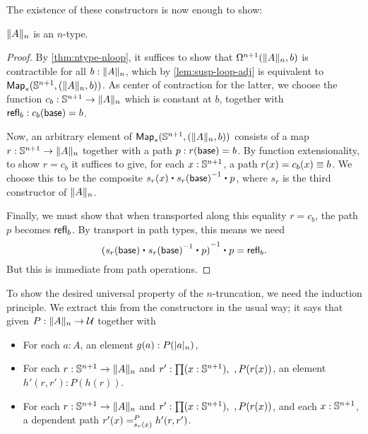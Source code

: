 The existence of these constructors is now enough to show:

\begin{lem}
  $\trunc n A$ is an $n$-type.
\end{lem}
\begin{proof}
  By \autoref{thm:ntype-nloop}, it suffices to show that $\Omega ^{n+1}(\trunc nA,b)$ is contractible for all $b:\trunc nA$, which by \autoref{lem:susp-loop-adj} is equivalent to $\Map_*(\Sn^{n+1},(\trunc nA,b))$.
  As center of contraction for the latter, we choose the function $c_b:\Sn^{n+1} \to \trunc nA$ which is constant at $b$, together with $\refl b : c_b(\base) = b$.

  Now, an arbitrary element of $\Map_*(\Sn^{n+1},(\trunc nA,b))$ consists of a map $r:\Sn^{n+1} \to \trunc n A$ together with a path $p:r(\base)=b$.
  By function extensionality, to show $r = c_b$ it suffices to give, for each $x:\Sn^{n+1}$, a path $r(x)=c_b(x) \jdeq b$.
  We choose this to be the composite $s_r(x) \ct \opp{s_r(\base)} \ct p$, where $s_r$ is the third constructor of $\trunc nA$.

  Finally, we must show that when transported along this equality $r=c_b$, the path $p$ becomes $\refl b$.
  By transport in path types, this means we need
  \[\opp{(s_r(\base) \ct \opp{s_r(\base)} \ct p)} \ct p = \refl b.\]
  But this is immediate from path operations.
\end{proof}

To show the desired universal property of the $n$-truncation, we need the induction principle.
We extract this from the constructors in the usual way; it says that given $P:\trunc nA\to\type$ together with
\begin{itemize}
\item For each $a:A$, an element $g(a) : P(\tproj na)$,
\item For each $r:\Sn^{n+1} \to \trunc n A$ and $r':\prd{x:\Sn^{n+1}}, P(r(x))$, an element $h'(r,r'):P(h(r))$.
\item For each $r:\Sn^{n+1} \to \trunc n A$ and $r':\prd{x:\Sn^{n+1}}, P(r(x))$, and each $x:\Sn^{n+1}$, a dependent path $\dpath{P}{s_r(x)}{r'(x)}{h'(r,r')}$.
\end{itemize}

